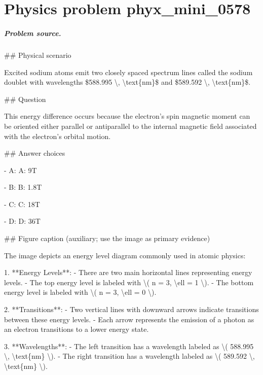 
\chapter{Physics problem phyx\_mini\_0578}
\label{ch:PhyXMiniProblems_problem_phyx_mini_0578}

\paragraph{Problem source.}
\#\# Physical scenario

Excited sodium atoms emit two closely spaced spectrum lines called the sodium doublet with wavelengths \$588.995 \textbackslash{}, \textbackslash{}text\{nm\}\$ and \$589.592 \textbackslash{}, \textbackslash{}text\{nm\}\$.

\#\# Question

This energy difference occurs because the electron's spin magnetic moment can be oriented either parallel or antiparallel to the internal magnetic field associated with the electron's orbital motion.

\#\# Answer choices

- A: A: 9T

- B: B: 1.8T

- C: C: 18T

- D: D: 36T

\#\# Figure caption (auxiliary; use the image as primary evidence)

The image depicts an energy level diagram commonly used in atomic physics:

1. **Energy Levels**:
   - There are two main horizontal lines representing energy levels.
   - The top energy level is labeled with \textbackslash{}( n = 3, \textbackslash{}ell = 1 \textbackslash{}).
   - The bottom energy level is labeled with \textbackslash{}( n = 3, \textbackslash{}ell = 0 \textbackslash{}).

2. **Transitions**:
   - Two vertical lines with downward arrows indicate transitions between these energy levels.
   - Each arrow represents the emission of a photon as an electron transitions to a lower energy state.

3. **Wavelengths**:
   - The left transition has a wavelength labeled as \textbackslash{}( 588.995 \textbackslash{}, \textbackslash{}text\{nm\} \textbackslash{}).
   - The right transition has a wavelength labeled as \textbackslash{}( 589.592 \textbackslash{}, \textbackslash{}text\{nm\} \textbackslash{}).

